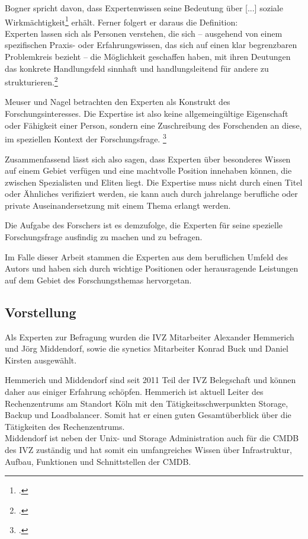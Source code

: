 Bogner spricht davon, dass Expertenwissen \glqq seine Bedeutung über [...] soziale Wirkmächtigkeit\grqq{}\footcite[][13]{Bogner_2014_Interview} erhält.
Ferner folgert er daraus die Definition:\\ \glqq Experten lassen sich als Personen verstehen, die sich -- ausgehend von einem spezifischen Praxis- oder Erfahrungswissen, das sich auf einen klar begrenzbaren Problemkreis bezieht -- die Möglichkeit geschaffen haben, mit ihren Deutungen das konkrete Handlungsfeld sinnhaft und handlungsleitend für andere zu strukturieren.\grqq{}\footcite[][13]{Bogner_2014_Interview}

Meuser und Nagel betrachten den Experten als Konstrukt des Forschungsinteresses. Die Expertise ist also keine allgemeingültige Eigenschaft oder Fähigkeit einer Person, sondern eine Zuschreibung des Forschenden an diese, im speziellen Kontext der Forschungsfrage. \footcite[Vgl.][181]{Meuser_1994_Interview}

Zusammenfassend lässt sich also sagen, dass Experten über besonderes Wissen auf einem Gebiet verfügen und eine machtvolle Position innehaben können, die zwischen Spezialisten und Eliten liegt. Die Expertise muss nicht durch einen Titel oder Ähnliches verifiziert werden, sie kann auch durch jahrelange berufliche oder private Auseinandersetzung mit einem Thema erlangt werden.

Die Aufgabe des Forschers ist es demzufolge, die Experten für seine spezielle Forschungsfrage ausfindig zu machen und zu befragen.

Im Falle dieser Arbeit stammen die Experten aus dem beruflichen Umfeld des Autors und haben sich durch wichtige Positionen oder herausragende Leistungen auf dem Gebiet des Forschungsthemas hervorgetan.



\subsection{Vorstellung}
Als Experten zur Befragung wurden die \acs{IVZ} Mitarbeiter Alexander Hemmerich und Jörg Middendorf, sowie die synetics Mitarbeiter Konrad Buck und Daniel Kirsten ausgewählt.

Hemmerich und Middendorf sind seit 2011 Teil der \acs{IVZ} Belegschaft und können daher aus einiger Erfahrung schöpfen. Hemmerich ist aktuell Leiter des Rechenzentrums am Standort Köln mit den Tätigkeitsschwerpunkten Storage, Backup und Loadbalancer. Somit hat er einen guten Gesamtüberblick über die Tätigkeiten des Rechenzentrums.\\
Middendorf ist neben der Unix- und Storage Administration auch für die \acs{CMDB} des \acs{IVZ} zuständig und hat somit ein umfangreiches Wissen über Infrastruktur, Aufbau, Funktionen und Schnittstellen der \acs{CMDB}.

